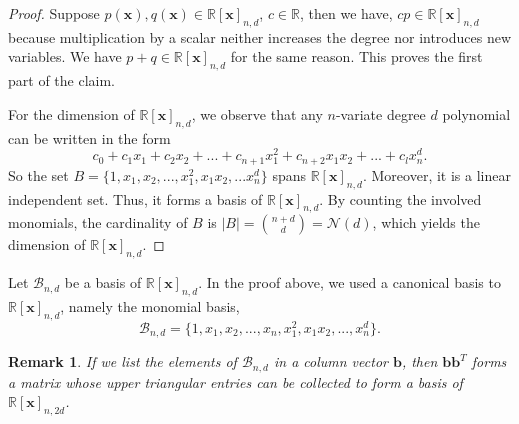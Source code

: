 \documentclass[12pt]{amsart}
\numberwithin{equation}{section}
\newtheorem{remark}[thm]{Remark}
\theoremstyle{definition}
\numberwithin{thm}{section}
\begin{document}
\begin{proof}
     Suppose $p(\mathbf{x}), q(\mathbf{x}) \in \mathbb{R}[\mathbf{x}]_{n, d}$, $c \in \mathbb{R}$, then we have,
     $cp \in \mathbb{R}[\mathbf{x}]_{n, d}$ because multiplication by a scalar neither increases the degree nor introduces new variables.
     We have $p + q \in \mathbb{R}[\mathbf{x}]_{n, d}$ for the same reason. This proves the first part of the claim. 

     For the dimension of $\mathbb{R}[\mathbf{x}]_{n, d}$, we observe that
     any $n$-variate degree $d$ polynomial can be written in the form 
     \begin{equation*}c_0 + c_1 x_1 + c_2 x_2 + ... + c_{n+1} x_1^2 + c_{n+2} x_1 x_2 + ... + c_l x_n^d.
     \end{equation*}
     So the set $B = \{1, x_1, x_2, ..., x_1^2, x_1 x_2, ... x_n^d\}$ spans $\mathbb{R}[\mathbf{x}]_{n, d}$.
     Moreover, it is a linear independent set. Thus, it forms a basis of $\mathbb{R}[\mathbf{x}]_{n, d}$.
     By counting the involved monomials, the cardinality of $B$ is $|B| = {n+d \choose d} = \mathcal{N}(d)$, 
     which yields the dimension of $\mathbb{R}[\mathbf{x}]_{n, d}$.

\end{proof}

Let $\mathcal{B}_{n, d}$ be a basis of $\mathbb{R}[\mathbf{x}]_{n, d}$. 
In the proof above, we used a canonical basis to $\mathbb{R}[\mathbf{x}]_{n, d}$, 
namely the monomial basis,
\begin{equation*}
     \mathcal{B}_{n, d} = \{1, x_1, x_2, ..., x_n, x_1 ^ 2, x_1 x_2, ..., x_n^d\}.
\end{equation*}

\begin{remark}
     \label{rem:upgrade}
     If we list the elements of $\mathcal{B}_{n, d}$ in a column vector $\mathbf{b}$, 
     then $\mathbf{b} \mathbf{b}^T$ forms a matrix whose upper triangular
     entries can be collected to form a basis of $\mathbb{R}[\mathbf{x}]_{n, 2d}$.
\end{remark}
\end{document}
